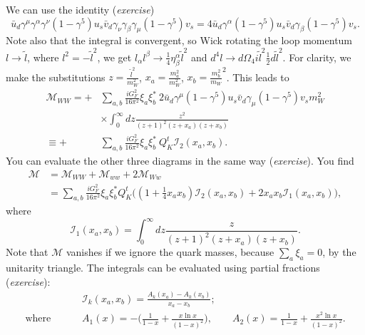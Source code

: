 We can use the identity (\textit{exercise}) 
\begin{equation}
\bar{u}_d \gamma^\mu \gamma^\alpha \gamma^\nu (1-\gamma^5) u_s \bar{v}_d \gamma_\nu \gamma_\beta \gamma_\mu(1-\gamma^5)v_s = 4 \bar{u}_d \gamma^\alpha (1-\gamma^5)u_s \bar{v}_d \gamma_\beta (1-\gamma^5)v_s.
\end{equation}
Note also that the integral is convergent, so Wick rotating the loop momentum $l \to \tilde{l}$, where $l^2 = -\tilde{l}^2$, we get $l_\alpha l^\beta \to \frac{1}{4}\eta^\alpha_\beta \tilde{l}^2$ and $d^4l \to d\Omega_4 i \tilde{l}^2\frac{1}{2}d\tilde{l}^2$. For clarity, we make the substitutions $z=\frac{\tilde{l}^2}{m_W^2}$, $x_a = \frac{m_a^2}{m_W^2}$, $x_b = \frac{m_b^2}{m_W}^2$. This leads to
\begin{equation}
\begin{split}
\mathcal{M}_{WW} = +&\sum_{a,b} \frac{iG_F^2}{16\pi^2} \xi_a \xi_b^*\ 2\bar{u}_d \gamma^\mu (1-\gamma^5) u_s \bar{v}_d \gamma_\mu (1-\gamma^5) v_s m_W^2 \\
&\times \int_0^\infty dz \frac{z^2}{(z+1)^2(z+x_a)(z+x_b)} \\
\equiv +&\sum_{a,b} \frac{iG_F^2}{16\pi^2} \xi_a \xi_b^*\ Q_K^t \mathcal{I}_2(x_a,x_b).
\end{split}
\end{equation}
You can evaluate the other three diagrams in the same way (\textit{exercise}). You find
\begin{equation}
\begin{split}
\mathcal{M} &= \mathcal{M}_{WW} + \mathcal{M}_{ww} + 2\mathcal{M}_{Ww} \\
&= \sum_{a,b} \frac{iG_F^2}{16\pi^2} \xi_a \xi_b^* Q_K^t\bigg((1+\frac{1}{4}x_a x_b)\mathcal{I}_2(x_a,x_b) + 2x_a x_b \mathcal{I}_1(x_a,x_b) \bigg),
\end{split}
\end{equation}
where 
\begin{equation}
\mathcal{I}_1(x_a,x_b) = \int_0^\infty dz \frac{z}{(z+1)^2(z+x_a)(z+x_b)}.
\end{equation}
Note that $\mathcal{M}$ vanishes if we ignore the quark masses, because $\sum_a \xi_a =0$, by the unitarity triangle. The integrals can be evaluated using partial fractions (\textit{exercise}):
\begin{equation}
\begin{split}
&\mathcal{I}_k(x_a,x_b) = \frac{A_k(x_a)-A_k(x_b)}{x_a-x_b}; \\
\text{where } \qquad &A_1(x) = -\bigg(\frac{1}{1-x} + \frac{x \ln x}{(1-x)^2}\bigg), \qquad A_2(x) = \frac{1}{1-x} + \frac{x^2 \ln x}{(1-x)^2}.
\end{split}
\end{equation}
